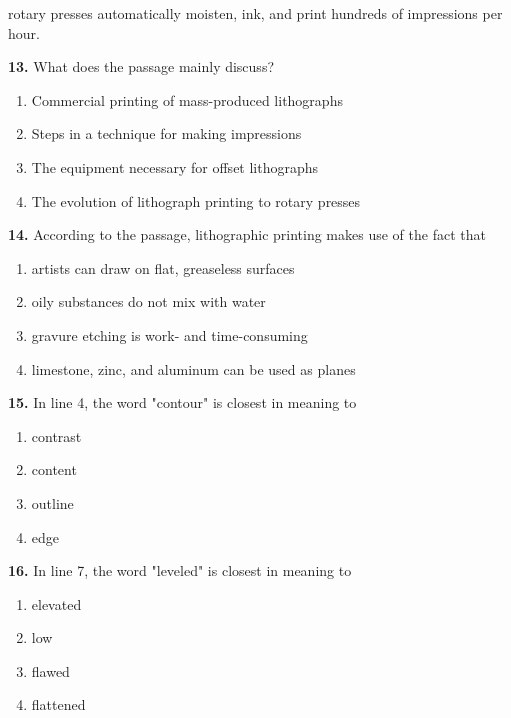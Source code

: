 \documentclass[12pt]{article}
\begin{document}
rotary presses automatically moisten, ink, and print hundreds of impressions per hour.\par
\endgroup
\medskip
\noindent\textbf{13.} What does the passage mainly discuss?
\begin{enumerate}[label=(\Alph*),leftmargin=*,itemsep=0.2em]
\item Commercial printing of mass-produced lithographs
\item Steps in a technique for making impressions
\item The equipment necessary for offset lithographs
\item The evolution of lithograph printing to rotary presses
\end{enumerate}
\par
\vspace{0.25\baselineskip}
\noindent\textbf{14.} According to the passage, lithographic printing makes use of the fact that
\begin{enumerate}[label=(\Alph*),leftmargin=*,itemsep=0.2em]
\item artists can draw on flat, greaseless surfaces
\item oily substances do not mix with water
\item gravure etching is work- and time-consuming
\item limestone, zinc, and aluminum can be used as planes
\end{enumerate}
\par
\vspace{0.25\baselineskip}
\noindent\textbf{15.} In line 4, the word "contour" is closest in meaning to
\begin{enumerate}[label=(\Alph*),leftmargin=*,itemsep=0.2em]
\item contrast
\item content
\item outline
\item edge
\end{enumerate}
\par
\vspace{0.25\baselineskip}
\noindent\textbf{16.} In line 7, the word "leveled" is closest in meaning to
\begin{enumerate}[label=(\Alph*),leftmargin=*,itemsep=0.2em]
\item elevated
\item low
\item flawed
\item flattened
\end{enumerate}
\par
\end{document}
